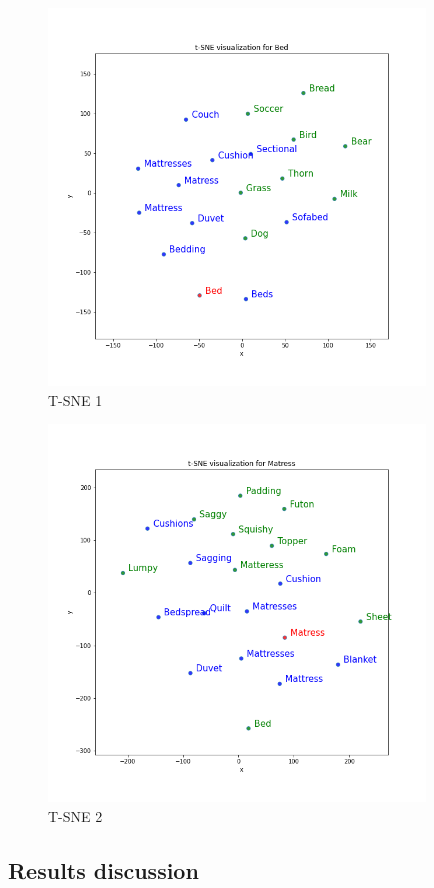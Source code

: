 \documentclass[a4paper]{article}    %
\begin{document}
\begin{figure}[H]
    \centering
    \includegraphics[width=10cm]{tsne1}
    \caption{T-SNE 1}
    \label{fig:tsne1}
\end{figure}

\begin{figure}[H]
    \centering
    \includegraphics[width=10cm]{tsne2}
    \caption{T-SNE 2}
    \label{fig:tsne2}
\end{figure}

\subsection{Results discussion}

\end{document}
